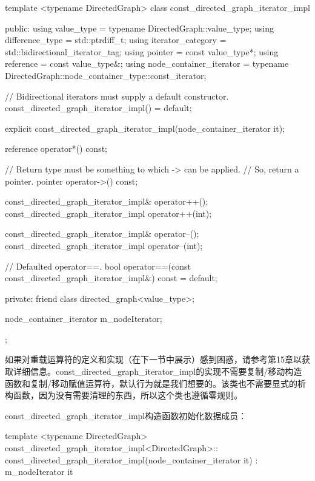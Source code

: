 \begin{cpp}
template <typename DirectedGraph>
class const_directed_graph_iterator_impl
{
    public:
        using value_type = typename DirectedGraph::value_type;
        using difference_type = std::ptrdiff_t;
        using iterator_category = std::bidirectional_iterator_tag;
        using pointer = const value_type*;
        using reference = const value_type&;
        using node_container_iterator =
            typename DirectedGraph::node_container_type::const_iterator;

        // Bidirectional iterators must supply a default constructor.
        const_directed_graph_iterator_impl() = default;

        explicit const_directed_graph_iterator_impl(node_container_iterator it);

        reference operator*() const;

        // Return type must be something to which -> can be applied.
        // So, return a pointer.
        pointer operator->() const;

        const_directed_graph_iterator_impl& operator++();
        const_directed_graph_iterator_impl operator++(int);

        const_directed_graph_iterator_impl& operator--();
        const_directed_graph_iterator_impl operator--(int);

        // Defaulted operator==.
        bool operator==(const const_directed_graph_iterator_impl&) const = default;

    private:
        friend class directed_graph<value_type>;

        node_container_iterator m_nodeIterator;
};
\end{cpp}

如果对重载运算符的定义和实现（在下一节中展示）感到困惑，请参考第15章以获取详细信息。const\_directed\_graph\_iterator\_impl的实现不需要复制/移动构造函数和复制/移动赋值运算符，默认行为就是我们想要的。该类也不需要显式的析构函数，因为没有需要清理的东西，所以这个类也遵循零规则。


const\_directed\_graph\_iterator\_impl构造函数初始化数据成员：

\begin{cpp}
template <typename DirectedGraph>
const_directed_graph_iterator_impl<DirectedGraph>::
    const_directed_graph_iterator_impl(node_container_iterator it)
        : m_nodeIterator { it } { }
\end{cpp}

